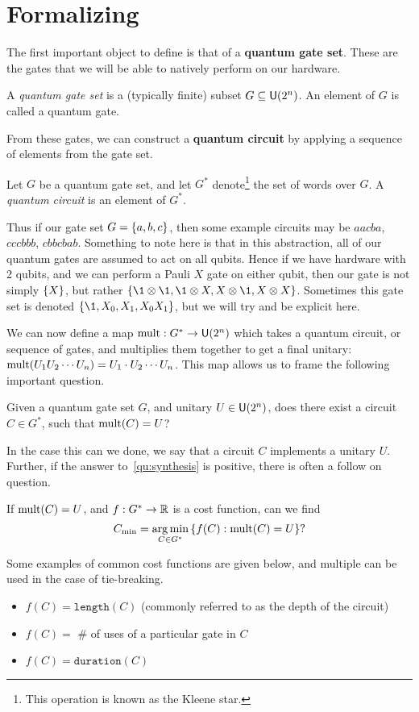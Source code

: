 \section{Formalizing}
The first important object to define is that of a \textbf{quantum gate set}.
These are the gates that we will be able to natively perform on our hardware.
\begin{definition}
    A \emph{quantum gate set} is a (typically finite) subset $G\subseteq \mathsf{U} (2^n)$. An element of $G$ is called a quantum gate.
\end{definition}
From these gates, we can construct a \textbf{quantum circuit} by applying a sequence of elements from the gate set.
\begin{definition}
    Let $G$ be a quantum gate set, and let $G^*$ denote\footnote{This operation is known as the Kleene star.} the set of words over $G$.
    A \emph{quantum circuit} is an element of $G^*$.
\end{definition}
Thus if our gate set $G = \qty{a, b, c}$, then some example circuits may be $aacba$, $cccbbb$, $cbbcbab$.
Something to note here is that in this abstraction, all of our quantum gates are assumed to act on all qubits.
Hence if we have hardware with 2 qubits, and we can perform a Pauli $X$ gate on either qubit, then our gate is not simply $\qty{X}$, but rather $\qty{\1\otimes \1, \1\otimes X, X\otimes \1, X\otimes X}$.
Sometimes this gate set is denoted $\qty{\1, X_0, X_1, X_0X_1}$, but we will try and be explicit here.

We can now define a map $\operatorname{mult}: G^* \to \mathsf{U} (2^n)$ which takes a quantum circuit, or sequence of gates, and multiplies them together to get a final unitary: $\operatorname{mult}(U_1U_2\cdots U_n) = U_1\cdot U_2\cdots U_n$.
This map allows us to frame the following important question.

\begin{question}\label{qu:synthesis}
    Given a quantum gate set $G$, and unitary $U\in\mathsf{U} (2^n)$, does there exist a circuit $C\in G^*$, such that $\operatorname{mult}(C) = U$?
\end{question}
In the case this can we done, we say that a circuit $C$ implements a unitary $U$.
Further, if the answer to~\ref{qu:synthesis} is positive, there is often a follow on question.
\begin{question}\label{qu:optimalsynthesis}
    If $\operatorname{mult}(C) = U$, and $f: G^* \to \mathbb{R}$ is a cost function, can we find
    \begin{equation*}
        C_\text{min} = \operatorname*{arg\,min}_{C\in G^*} \qty{f(C) : \operatorname{mult}(C) = U}?
    \end{equation*}
\end{question}
Some examples of common cost functions are given below, and multiple can be used in the case of tie-breaking.
\begin{itemize}
    \item $f(C) = \mathtt{length}(C)$ (commonly referred to as the depth of the circuit)
    \item $f(C) = $ \# of uses of a particular gate in $C$
    \item $f(C) = \mathtt{duration}(C)$
\end{itemize}

